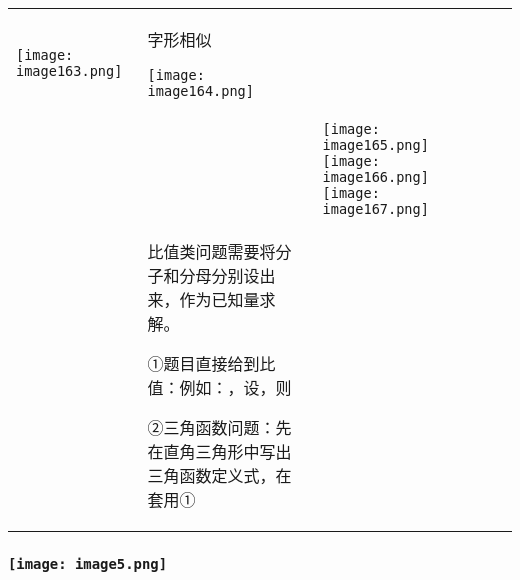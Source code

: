 \begin{longtable}[]{@{}llll@{}}
\begin{minipage}[t]{0.22\columnwidth}
\texttt{[image: image163.png]}\strut
\end{minipage} & \begin{minipage}[t]{0.22\columnwidth}\raggedright
字形相似

\texttt{[image: image164.png]}\strut
\end{minipage}\tabularnewline
& &
\texttt{[image: image165.png]}
\texttt{[image: image166.png]}
\texttt{[image: image167.png]}
&\tabularnewline
\begin{minipage}[t]{0.22\columnwidth}\raggedright
\strut
\end{minipage} & \begin{minipage}[t]{0.22\columnwidth}\raggedright
比值类问题需要将分子和分母分别设出来，作为已知量求解。

①题目直接给到比值：例如：，设，则

②三角函数问题：先在直角三角形中写出三角函数定义式，在套用①\strut
\end{minipage} & \begin{minipage}[t]{0.22\columnwidth}\raggedright
\strut
\end{minipage} & \begin{minipage}[t]{0.22\columnwidth}\raggedright
\strut
\end{minipage}\tabularnewline
\bottomrule
\end{longtable}

\hypertarget{ux5b66ux79d1ux7f51www.zxxk.com--ux6559ux80b2ux8d44ux6e90ux95e8ux6237ux63d0ux4f9bux8bd5ux9898ux8bd5ux5377ux6559ux6848ux8bfeux4ef6ux6559ux5b66ux8bbaux6587ux7d20ux6750ux7b49ux5404ux7c7bux6559ux5b66ux8d44ux6e90ux5e93ux4e0bux8f7dux8fd8ux6709ux5927ux91cfux4e30ux5bccux7684ux6559ux5b66ux8d44ux8baf-29}{%
\subsubsection{\texorpdfstring{\protect\texttt{[image: image5.png]}}{学科网(www.zxxk.com)-\/-教育资源门户，提供试题试卷、教案、课件、教学论文、素材等各类教学资源库下载，还有大量丰富的教学资讯！}}\label{ux5b66ux79d1ux7f51www.zxxk.com--ux6559ux80b2ux8d44ux6e90ux95e8ux6237ux63d0ux4f9bux8bd5ux9898ux8bd5ux5377ux6559ux6848ux8bfeux4ef6ux6559ux5b66ux8bbaux6587ux7d20ux6750ux7b49ux5404ux7c7bux6559ux5b66ux8d44ux6e90ux5e93ux4e0bux8f7dux8fd8ux6709ux5927ux91cfux4e30ux5bccux7684ux6559ux5b66ux8d44ux8baf-29}}

